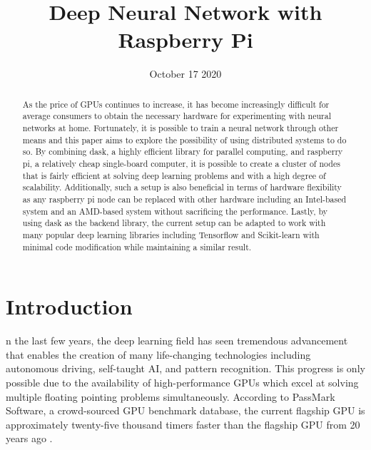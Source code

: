 \documentclass{IEEEtran}
\begin{document}
    \title{Deep Neural Network with Raspberry Pi}


    \author{
    }
    \date{October 17 2020}
    \maketitle

    \begin{abstract}
        As the price of GPUs continues to increase, it has become increasingly difficult for average consumers to obtain the necessary hardware for experimenting with neural networks at home. Fortunately, it is possible to train a neural network through other means and this paper aims to explore the possibility of using distributed systems to do so. By combining dask, a highly efficient library for parallel computing, and raspberry pi, a relatively cheap single-board computer, it is possible to create a cluster of nodes that is fairly efficient at solving deep learning problems and with a high degree of scalability. Additionally, such a setup is also beneficial in terms of hardware flexibility as any raspberry pi node can be replaced with other hardware including an Intel-based system and an AMD-based system without sacrificing the performance. Lastly, by using dask as the backend library, the current setup can be adapted to work with many popular deep learning libraries including Tensorflow and Scikit-learn with minimal code modification while maintaining a similar result.
        \end{abstract}

    \section{Introduction}
        n the last few years, the deep learning field has seen tremendous advancement that enables the creation of many life-changing technologies including autonomous driving, self-taught AI, and pattern recognition. This progress is only possible due to the availability of high-performance GPUs which excel at solving multiple floating pointing problems simultaneously.
        According to PassMark Software, a crowd-sourced GPU benchmark database, the current flagship GPU is approximately twenty-five thousand timers faster than the flagship GPU from 20 years ago \cite{passmark_software}. 
\end{document}
